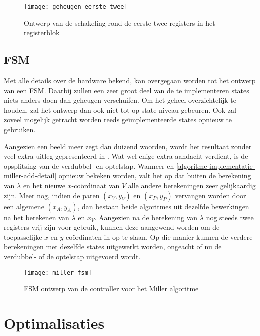 \begin{figure}[h]
	\centering
		\texttt{[image: geheugen-eerste-twee]}
		\caption{Ontwerp van de schakeling rond de eerste twee registers in het registerblok\label{figuur-implementatie-geheugen-eerste-twee}}
\end{figure}

\subsection{FSM}

Met alle details over de hardware bekend, kan overgegaan worden tot het ontwerp van een FSM. Daarbij zullen een zeer groot deel van de te implementeren states niets anders doen dan geheugen verschuifen. Om het geheel overzichtelijk te houden, zal het ontwerp dan ook niet tot op state niveau gebeuren. Ook zal zoveel mogelijk getracht worden reeds ge\"implementeerde states opnieuw te gebruiken.

Aangezien een beeld meer zegt dan duizend woorden, wordt het resultaat zonder veel extra uitleg gepresenteerd in . Wat wel enige extra aandacht verdient, is de opsplitsing van de verdubbel- en optelstap. Wanneer  en \ref{algoritme-implementatie-miller-add-detail} opnieuw bekeken worden, valt het op dat buiten de berekening van $\lambda$ en het nieuwe $x$-co\"ordinaat van $V$ alle andere berekeningen zeer gelijkaardig zijn. Meer nog, indien de paren $(x_V, y_V)$ en $(x_P, y_P)$ vervangen worden door een algemene $(x_A, y_A)$, dan bestaan beide algoritmes uit dezelfde bewerkingen na het berekenen van $\lambda$ en $x_V$. Aangezien na de berekening van $\lambda$ nog steeds twee registers vrij zijn voor gebruik, kunnen deze aangewend worden om de toepasselijke $x$ en $y$ co\"ordinaten in op te slaan. Op die manier kunnen de verdere berekeningen met dezelfde states uitgewerkt worden, ongeacht of nu de verdubbel- of de optelstap uitgevoerd wordt.

\begin{figure}[h]
	\centering
		\texttt{[image: miller-fsm]}
		\caption{FSM ontwerp van de controller voor het Miller algoritme\label{figuur-miller-fsm}}
\end{figure}

\section{Optimalisaties}


